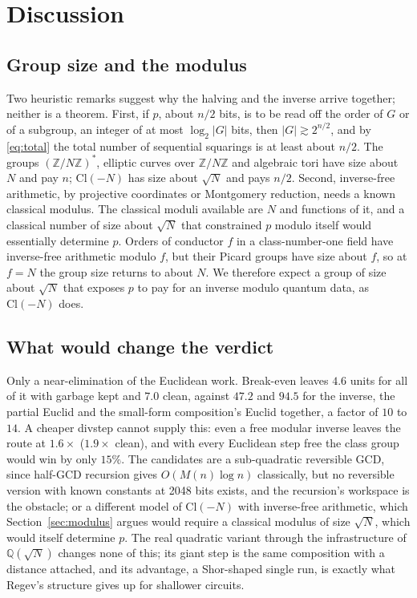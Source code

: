 \documentclass[runningheads]{llncs}
\newcommand{\Cl}{\mathrm{Cl}}
\newcommand{\Z}{\mathbb{Z}}
\newcommand{\Q}{\mathbb{Q}}
\begin{document}
\section{Discussion}\label{sec:disc}
\subsection{Group size and the modulus}\label{sec:floor}\label{sec:modulus}
Two heuristic remarks suggest why the halving and the inverse arrive together; neither is a theorem. First, if $p$, about $n/2$ bits, is to be read off the order of $G$ or of a subgroup, an integer of at most $\log_2|G|$ bits, then $|G|\gtrsim2^{n/2}$, and by \eqref{eq:total} the total number of sequential squarings is at least about $n/2$. The groups $(\Z/N\Z)^*$, elliptic curves over $\Z/N\Z$ and algebraic tori have size about $N$ and pay $n$; $\Cl(-N)$ has size about $\sqrt N$ and pays $n/2$. Second, inverse-free arithmetic, by projective coordinates or Montgomery reduction, needs a known classical modulus. The classical moduli available are $N$ and functions of it, and a classical number of size about $\sqrt N$ that constrained $p$ modulo itself would essentially determine $p$. Orders of conductor $f$ in a class-number-one field have inverse-free arithmetic modulo $f$, but their Picard groups have size about $f$, so at $f=N$ the group size returns to about $N$. We therefore expect a group of size about $\sqrt N$ that exposes $p$ to pay for an inverse modulo quantum data, as $\Cl(-N)$ does.

\subsection{What would change the verdict}
Only a near-elimination of the Euclidean work. Break-even leaves $4.6$ units for all of it with garbage kept and $7.0$ clean, against $47.2$ and $94.5$ for the inverse, the partial Euclid and the small-form composition's Euclid together, a factor of $10$ to $14$. A cheaper divstep cannot supply this: even a free modular inverse leaves the route at $1.6\times$ ($1.9\times$ clean), and with every Euclidean step free the class group would win by only $15\%$. The candidates are a sub-quadratic reversible GCD, since half-GCD recursion gives $O(M(n)\log n)$ classically, but no reversible version with known constants at 2048 bits exists, and the recursion's workspace is the obstacle; or a different model of $\Cl(-N)$ with inverse-free arithmetic, which Section~\ref{sec:modulus} argues would require a classical modulus of size $\sqrt N$, which would itself determine $p$. The real quadratic variant through the infrastructure of $\Q(\sqrt N)$ changes none of this; its giant step is the same composition with a distance attached, and its advantage, a Shor-shaped single run, is exactly what Regev's structure gives up for shallower circuits.
\end{document}
